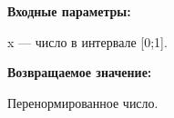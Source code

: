 \textbf{Входные параметры:}

 x --- число в интервале [0;1].

\textbf{Возвращаемое значение:}
 
Перенормированное число.
